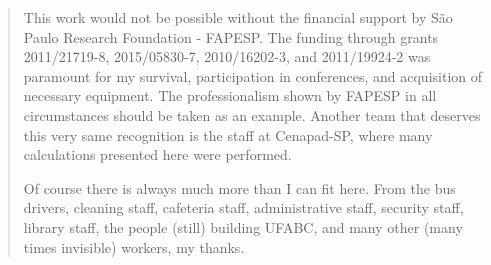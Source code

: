 \begin{quote}
This work would not be possible without the financial support by São Paulo Research Foundation - FAPESP. The funding through grants 2011/21719-8, 2015/05830-7, 2010/16202-3, and 2011/19924-2 was paramount for my survival, participation in conferences, and acquisition of necessary equipment. The professionalism shown by FAPESP in all circumstances should be taken as an example. Another team that deserves this very same recognition is the staff at Cenapad-SP, where many calculations presented here were performed.

Of course there is always much more than I can fit here. From the bus drivers, cleaning staff, cafeteria staff, administrative staff, security staff, library staff, the people (still) building UFABC, and many other (many times invisible) workers, my thanks.
\end{quote}

\newpage
\hspace{1cm}
\newpage

